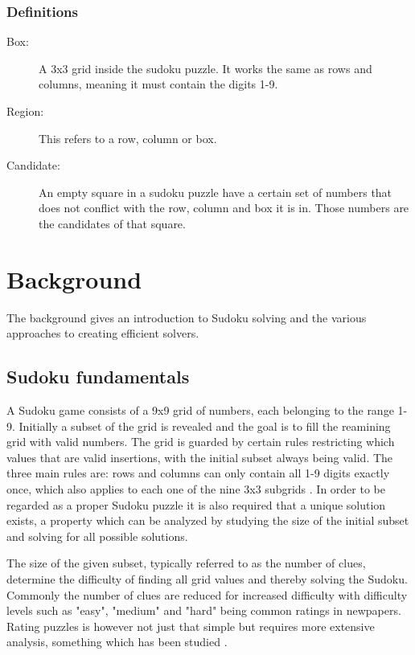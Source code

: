 \documentclass[a4paper,11pt]{kth-mag}
\begin{document}
\subsection{Definitions}
\begin{description}
    \item[Box:] A 3x3 grid inside the sudoku puzzle. It works the same as rows and columns, meaning it must contain the digits 1-9.
    \item[Region:] This refers to a row, column or box.
    \item[Candidate:] An empty square in a sudoku puzzle have a certain set of numbers that does not conflict with the row, column and box it is in. Those numbers are the candidates of that square.
\end{description}


\chapter{Background}
The background gives an introduction to Sudoku solving and the various approaches to creating efficient solvers.

\FloatBarrier
\section{Sudoku fundamentals}
A Sudoku game consists of a 9x9 grid of numbers, each belonging to the range 1-9.
Initially a subset of the grid is revealed and the goal is to fill the reamining grid with valid numbers.
The grid is guarded by certain rules restricting which values that are valid insertions, with the initial subset always being valid.
The three main rules are: rows and columns can only contain all 1-9 digits exactly once, which also applies to each one of the nine 3x3 subgrids \cite{17clueProof}.
In order to be regarded as a proper Sudoku puzzle it is also required that a unique solution exists, a property which can be analyzed by studying the size of the initial subset and solving for all possible solutions.

The size of the given subset, typically referred to as the number of clues, determine the difficulty of finding all grid values and thereby solving the Sudoku.
Commonly the number of clues are reduced for increased difficulty with difficulty levels such as "easy", "medium" and "hard" being common ratings in newpapers.
Rating puzzles is however not just that simple but requires more extensive analysis, something which has been studied \cite{sudokuDifficulty}.
\end{document}
